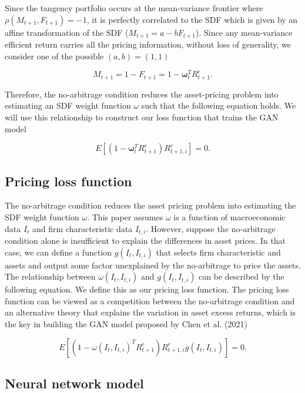\documentclass[12pt]{article}
\begin{document}
Since the tangency portfolio occurs at the mean-variance
frontier where \(\rho(M_{t+1}, F_{t+1})=-1\),
it is perfectly correlated to the SDF
which is given by an affine transformation of the SDF
(\(M_{t+1} = a - b F_{t+1}\)). Since any
mean-variance efficient return carries all the pricing
information, without loss of generality,
we consider one of the possible \((a, b) = (1, 1)\)

\[
M_{t+1} = 1 - F_{t+1} = 1 - \mathbf{\omega}_t^T R^e_{t+1}.
\]

Therefore, the no-arbitrage condition reduces the
asset-pricing problem into estimating an SDF weight function
\(\omega\) such that the following equation holds. We will
use this relationship to construct our loss function that
trains the GAN model

\[
E\left[\left(1-\mathbf{\omega}_t^T R^e_{t+1}\right)R^e_{t+1, i}\right] = 0.
\]

\hypertarget{loss_function}{%
\subsection{Pricing loss function}\label{loss_function}}

The no-arbitrage condition reduces the asset pricing problem
into estimating the SDF weight function \(\omega\).
This paper assumes \(\omega\) is a function of
macroeconomic data \(I_t\) and firm characteristic
data \(I_{t, i}\).
However, suppose the no-arbitrage condition
alone is insufficient to explain the differences in asset
prices. In that case, we can define a function \(g(I_t, I_{t, i})\)
that selects firm characteristic and assets and output some factor
unexplained by the no-arbitrage
to price the assets. The relationship between \(\omega(I_t, I_{t, i})\) and \(g(I_t, I_{t, i})\) can be described by the
following equation. We define this as our pricing loss
function. The pricing loss function can be viewed as a
competition between the no-arbitrage condition and an
alternative theory that explains the variation in
asset excess returns, which is the key in building the
GAN model proposed by Chen et al. (2021)

\[
E\left[\left(1-\omega(I_t, I_{t, i})^T R^e_{t+1}\right)R^e_{t+1, i}
g(I_t, I_{t, i})
\right] = 0.
\]

\hypertarget{nn_model}{%
\subsection{Neural network model}\label{nn_model}}
\end{document}

